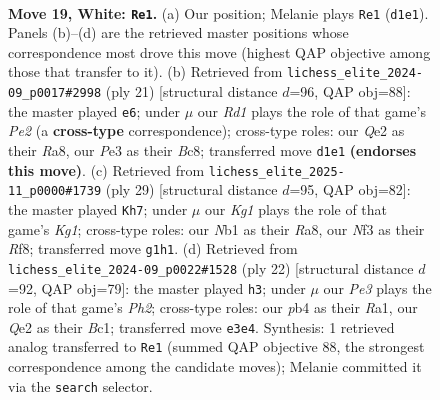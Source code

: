 \documentclass[11pt]{article}
\begin{document}
\clearpage

\begin{figure}[p]\centering
\begin{subfigure}{0.46\textwidth}\centering
\resizebox{\linewidth}{!}{%
\newchessgame
\chessboard[
  setfen={r1b1k1r1/p3b1pp/1pnq4/3p1p1n/Pp1P3P/4PNPB/R3QP2/1NBR2K1 w - - 1 19},
  showmover=false,
  pgfstyle=straightmove, color=movearrow, markmove={d1-e1}
]}
\caption{}
\end{subfigure}\hfill
\begin{subfigure}{0.46\textwidth}\centering
\resizebox{\linewidth}{!}{%
\newchessgame
\chessboard[
  setfen={r1bq1rk1/1pp1ppbp/n4np1/p2PN3/2P5/2NB4/PP3PPP/R1BQR1K1 b - - 0 11},
  showmover=false,
  pgfstyle=straightmove, color=movearrow, markmove={e7-e6}
]}
\caption{}
\end{subfigure}
\\[4pt]
\begin{subfigure}{0.46\textwidth}\centering
\resizebox{\linewidth}{!}{%
\newchessgame
\chessboard[
  setfen={r1b2rk1/pp1n1p2/2p2qp1/4p2p/4P2P/2N3Q1/PPP1BPPR/R3K3 b Q - 0 15},
  showmover=false,
  pgfstyle=straightmove, color=movearrow, markmove={g8-h7}
]}
\caption{}
\end{subfigure}\hfill
\begin{subfigure}{0.46\textwidth}\centering
\resizebox{\linewidth}{!}{%
\newchessgame
\chessboard[
  setfen={r1b1k2r/1pp2ppp/p1n2n2/2b2q2/2N1p3/1QP3P1/PP2PPBP/R1B2RK1 w kq - 2 12},
  showmover=false,
  pgfstyle=straightmove, color=movearrow, markmove={h2-h3}
]}
\caption{}
\end{subfigure}
\caption{\textbf{Move 19, White: \texttt{Re1}.} (a) Our position; Melanie plays \texttt{Re1} (\texttt{d1e1}). Panels (b)--(d) are the retrieved master positions whose correspondence most drove this move (highest QAP objective among those that transfer to it). (b) Retrieved from \texttt{lichess\_elite\_2024-09\_p0017\#2998} (ply 21) [structural distance $d$=96, QAP obj=88]: the master played \texttt{e6}; under $\mu$ our \emph{Rd1} plays the role of that game's \emph{Pe2} (a \textbf{cross-type} correspondence); cross-type roles: our \emph{Q}e2 as their \emph{R}a8, our \emph{P}e3 as their \emph{B}c8; transferred move \texttt{d1e1} \textbf{(endorses this move)}. (c) Retrieved from \texttt{lichess\_elite\_2025-11\_p0000\#1739} (ply 29) [structural distance $d$=95, QAP obj=82]: the master played \texttt{Kh7}; under $\mu$ our \emph{Kg1} plays the role of that game's \emph{Kg1}; cross-type roles: our \emph{N}b1 as their \emph{R}a8, our \emph{N}f3 as their \emph{R}f8; transferred move \texttt{g1h1}. (d) Retrieved from \texttt{lichess\_elite\_2024-09\_p0022\#1528} (ply 22) [structural distance $d$=92, QAP obj=79]: the master played \texttt{h3}; under $\mu$ our \emph{Pe3} plays the role of that game's \emph{Ph2}; cross-type roles: our \emph{p}b4 as their \emph{R}a1, our \emph{Q}e2 as their \emph{B}c1; transferred move \texttt{e3e4}. Synthesis: 1 retrieved analog transferred to \texttt{Re1} (summed QAP objective 88, the strongest correspondence among the candidate moves); Melanie committed it via the \texttt{search} selector.}
\label{fig:thought-m36}
\end{figure}
\end{document}
